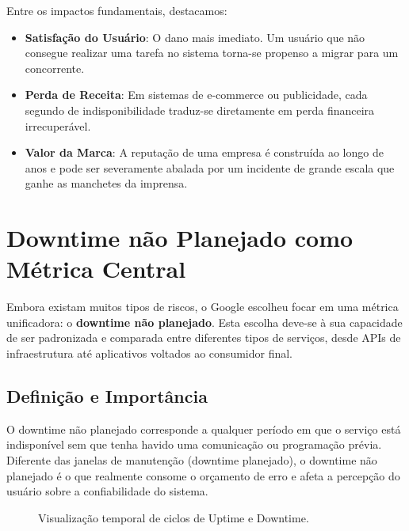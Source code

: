 \documentclass[12pt,a4paper,twoside]{report}
\begin{document}
Entre os impactos fundamentais, destacamos:
\begin{itemize}
    \item \textbf{Satisfação do Usuário}: O dano mais imediato. Um usuário que não consegue realizar uma tarefa no sistema torna-se propenso a migrar para um concorrente.
    \item \textbf{Perda de Receita}: Em sistemas de e-commerce ou publicidade, cada segundo de indisponibilidade traduz-se diretamente em perda financeira irrecuperável.
    \item \textbf{Valor da Marca}: A reputação de uma empresa é construída ao longo de anos e pode ser severamente abalada por um incidente de grande escala que ganhe as manchetes da imprensa.
\end{itemize}

\section{Downtime não Planejado como Métrica Central}

Embora existam muitos tipos de riscos, o Google escolheu focar em uma métrica unificadora: o \textbf{downtime não planejado}. Esta escolha deve-se à sua capacidade de ser padronizada e comparada entre diferentes tipos de serviços, desde APIs de infraestrutura até aplicativos voltados ao consumidor final.

\subsection{Definição e Importância}

O downtime não planejado corresponde a qualquer período em que o serviço está indisponível sem que tenha havido uma comunicação ou programação prévia. Diferente das janelas de manutenção (downtime planejado), o downtime não planejado é o que realmente consome o orçamento de erro e afeta a percepção do usuário sobre a confiabilidade do sistema.

\begin{figure}[h]
    \centering
    \caption{Visualização temporal de ciclos de Uptime e Downtime.}
\end{figure}
\end{document}
